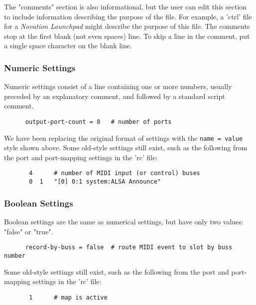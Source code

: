    The "comments" section is also informational, but the user can edit this
   section to include information describing the purpose of the file.  For
   example, a 'ctrl' file for a \textsl{Novation Launchpad} might describe the
   purpose of this file.  The comments stop at the first blank (not even spaces)
   line.  To skip a line in the comment, put a single space character on the
   blank line.

\subsubsection{Numeric Settings}
\label{subsec:configuration_common_numeric_settings}

   Numeric settings consist of a line containing one or more numbers, usually
   preceded by an explanatory comment, and followed by a standard script
   comment.

   \begin{verbatim}
      output-port-count = 8   # number of ports
   \end{verbatim}

   We have been replacing the original format of settings with the
   \texttt{name = value} style shown above.
   Some old-style settings still exist, such as the following from
   the port and port-mapping settings in the 'rc' file:

   \begin{verbatim}
       4      # number of MIDI input (or control) buses
       0  1   "[0] 0:1 system:ALSA Announce"
   \end{verbatim}

\subsubsection{Boolean Settings}
\label{subsec:configuration_common_boolean_settings}

   Boolean settings are the same as numerical settings, but have only
   two values: "false" or "true".

   \begin{verbatim}
      record-by-buss = false  # route MIDI event to slot by buss number
   \end{verbatim}

   Some old-style settings still exist, such as the following from
   the port and port-mapping settings in the 'rc' file:

   \begin{verbatim}
       1      # map is active
   \end{verbatim}

